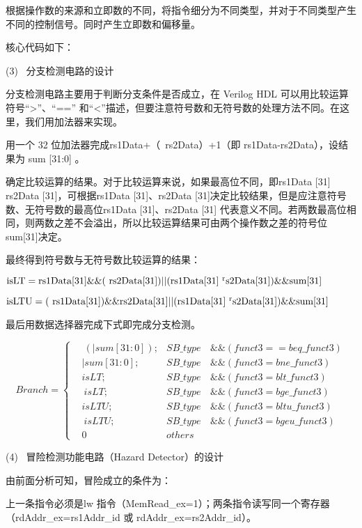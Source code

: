 \documentclass{../source/Experiment}
\begin{document}
根据操作数的来源和立即数的不同，将指令细分为不同类型，并对于不同类型产生不同的控制信号。同时产生立即数和偏移量。

核心代码如下：

(3) \, 分支检测电路的设计

分支检测电路主要用于判断分支条件是否成立，在 Verilog HDL 可以用比较运算符号“>”、“==” 和“<”描述，但要注意符号数和无符号数的处理方法不同。在这里，我们用加法器来实现。

用一个 32 位加法器完成rs1Data+（~rs2Data）+1（即 rs1Data-rs2Data），设结果为 sum [31:0] 。

确定比较运算的结果。对于比较运算来说，如果最高位不同，即rs1Data [31]  rs2Data [31]，可根据rs1Data [31]、rs2Data [31]决定比较结果，但是应注意符号数、无符号数的最高位rs1Data [31]、rs2Data [31] 代表意义不同。若两数最高位相同，则两数之差不会溢出，所以比较运算结果可由两个操作数之差的符号位 sum[31]决定。

最终得到符号数与无符号数比较运算的结果：

$ \rm isLT=rs1Data[31]\&\&(~rs2Data[31]) || (rs1Data[31]~^rs2Data[31]) \&\& sum[31]$

$ \rm isLTU= (~rs1Data[31] )\&\& rs2Data[31] || (rs1Data[31]~^rs2Data[31]) \&\& sum[31]$

最后用数据选择器完成下式即完成分支检测。

$$Branch = \left\{
    \begin{aligned}
         & ~ (| sum[31 : 0]); & SB\_type & \, \& \& (funct3 == beq\_funct3 ) \\
         & | sum[31 : 0];     & SB\_type & \, \& \& (funct3 = bne\_funct3 )  \\
         & isLT;              & SB\_type & \, \& \&(funct3 = blt\_funct3 )   \\
         & ~ isLT ;           & SB\_type & \, \& \& (funct3 = bge\_funct3 )  \\
         & isLTU ;            & SB\_type & \, \& \& (funct3 = bltu\_funct 3) \\
         & ~ isLTU ;          & SB\_type & \, \& \& (funct3 = bgeu\_funct3)  \\
         & 0                  & others   &
    \end{aligned}\right.
$$

(4) \, 冒险检测功能电路（Hazard Detector）的设计

由前面分析可知，冒险成立的条件为：

上一条指令必须是lw 指令（MemRead\_ex=1）；两条指令读写同一个寄存器（rdAddr\_ex=rs1Addr\_id 或 rdAddr\_ex=rs2Addr\_id）。
\end{document}
